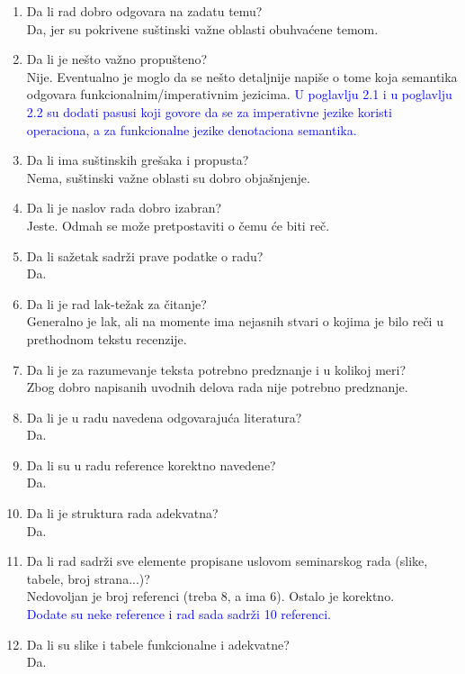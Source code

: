 \documentclass[a4paper]{report}
\newcommand{\odgovor}[1]{\textcolor{blue}{#1}}
\begin{document}
\begin{enumerate}
\item Da li rad dobro odgovara na zadatu temu?\\
{Da, jer su pokrivene suštinski važne oblasti obuhvaćene temom.}
\item Da li je nešto važno propušteno?\\
{Nije. Eventualno je moglo da se nešto detaljnije napiše o tome koja semantika odgovara funkcionalnim/imperativnim jezicima.}
\odgovor{U poglavlju 2.1 i u poglavlju 2.2 su dodati pasusi koji govore da se za imperativne jezike koristi operaciona, a za funkcionalne jezike denotaciona semantika.}
\item Da li ima suštinskih grešaka i propusta?\\
{Nema, suštinski važne oblasti su dobro objašnjenje.}
\item Da li je naslov rada dobro izabran?\\
{Jeste. Odmah se može pretpostaviti o čemu će biti reč.}
\item Da li sažetak sadrži prave podatke o radu?\\
{Da.}
\item Da li je rad lak-težak za čitanje?\\
{Generalno je lak, ali na momente ima nejasnih stvari o kojima je bilo reči u prethodnom tekstu recenzije.}
\item Da li je za razumevanje teksta potrebno predznanje i u kolikoj meri?\\
{Zbog dobro napisanih uvodnih delova rada nije potrebno predznanje.}
\item Da li je u radu navedena odgovarajuća literatura?\\
{Da.}
\item Da li su u radu reference korektno navedene?\\
{Da.}
\item Da li je struktura rada adekvatna?\\
{Da.}
\item Da li rad sadrži sve elemente propisane uslovom seminarskog rada (slike, tabele, broj strana...)?\\
{Nedovoljan je broj referenci (treba 8, a ima 6). Ostalo je korektno.}\\
\odgovor{Dodate su neke reference i rad sada sadrži 10 referenci.}
\item Da li su slike i tabele funkcionalne i adekvatne?\\
{Da.}
\end{enumerate}
\end{document}
